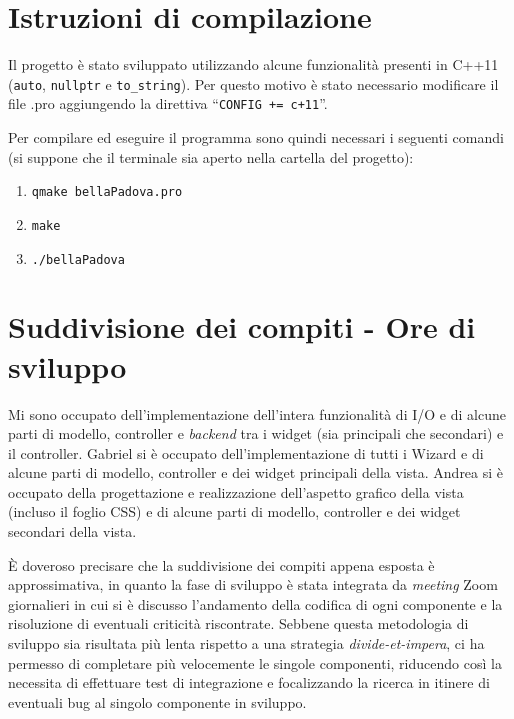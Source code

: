 \documentclass[
  10pt,
]{article}
\providecommand{\tightlist}{%
  \setlength{\itemsep}{0pt}\setlength{\parskip}{0pt}}
\begin{document}
\hypertarget{istruzioni-di-compilazione}{%
\section{Istruzioni di compilazione}\label{istruzioni-di-compilazione}}

Il progetto è stato sviluppato utilizzando alcune funzionalità presenti
in C++11 (\texttt{auto}, \texttt{nullptr} e \texttt{to\_string}). Per
questo motivo è stato necessario modificare il file .pro aggiungendo la
direttiva ``\texttt{CONFIG\ +=\ c+11}''.

Per compilare ed eseguire il programma sono quindi necessari i seguenti
comandi (si suppone che il terminale sia aperto nella cartella del
progetto):

\begin{enumerate}
\def\labelenumi{\arabic{enumi}.}
\tightlist
\item
  \texttt{qmake\ bellaPadova.pro}
\item
  \texttt{make}
\item
  \texttt{./bellaPadova}
\end{enumerate}

\hypertarget{suddivisione-dei-compiti---ore-di-sviluppo}{%
\section{Suddivisione dei compiti - Ore di
sviluppo}\label{suddivisione-dei-compiti---ore-di-sviluppo}}

Mi sono occupato dell'implementazione dell'intera funzionalità di I/O e
di alcune parti di modello, controller e \emph{backend} tra i widget
(sia principali che secondari) e il controller. Gabriel si è occupato
dell'implementazione di tutti i Wizard e di alcune parti di modello,
controller e dei widget principali della vista. Andrea si è occupato
della progettazione e realizzazione dell'aspetto grafico della vista
(incluso il foglio CSS) e di alcune parti di modello, controller e dei
widget secondari della vista.

È doveroso precisare che la suddivisione dei compiti appena esposta è
approssimativa, in quanto la fase di sviluppo è stata integrata da
\emph{meeting} Zoom giornalieri in cui si è discusso l'andamento della
codifica di ogni componente e la risoluzione di eventuali criticità
riscontrate. Sebbene questa metodologia di sviluppo sia risultata più
lenta rispetto a una strategia \emph{divide-et-impera}, ci ha permesso
di completare più velocemente le singole componenti, riducendo così la
necessita di effettuare test di integrazione e focalizzando la ricerca
in itinere di eventuali bug al singolo componente in sviluppo.
\end{document}
